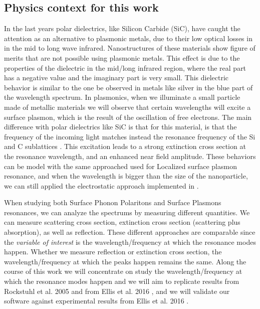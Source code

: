 \subsection{Physics context for this work}

In the last years polar dielectrics, like Silicon Carbide (SiC), have caught the attention as an alternative to plasmonic metals, due to their low optical losses in in the
mid to long wave infrared. Nanostructures of these materials show figure of merits that are not possible using plasmonic metals. This effect is due to the properties 
of the dielectric in the mid/long infrared region, where the real part has a negative value and the imaginary part is very small. This dielectric behavior is similar to the one 
be observed in metals like silver in the blue part of the wavelength spectrum. 
In plasmonics, when we illuminate a small particle made of metallic materials we will observe that certain wavelengths will excite a surface plasmon, which is the result of 
the oscillation of free electrons. The main difference with polar dielectrics like SiC is that for this material, is that the frequency of the incoming light matches instead the
resonance frequency of the Si and C sublattices \cite{caldwell2015,rockstuhl2005}. This excitation leads to a strong extinction cross section at the resonance wavelength, and an 
enhanced near field amplitude. These behaviors can be model with the same approached used for Localized surface plasmon resonance, and when the wavelength is bigger than the size
of the nanoparticle, we can still applied the electrostatic approach implemented in \pygbe \cite{ClementiETal2017, ClementiETal2019}.

When studying both Surface Phonon Polaritons and Surface Plasmons resonances, we can analyze the spectrums by measuring different quantities. We can measure scattering cross section, extinction cross section 
(scattering plus absorption), as well as reflection. These different approaches are comparable since the \textit{variable of interest} is the wavelength/frequency at which 
the resonance modes happen. Whether we measure reflection or extinction cross section, the wavelength/frequency at which the peaks happen remains the same. Along the course of this 
work we will concentrate on study the wavelength/frequency at which the resonance modes happen and we will aim to replicate results from Rockstuhl et al. 2005 \cite{rockstuhl2005} and 
from Ellis et al. 2016 \cite{ellis2016}, and we will validate our software against experimental results from Ellis et al. 2016 \cite{ellis2016}.
